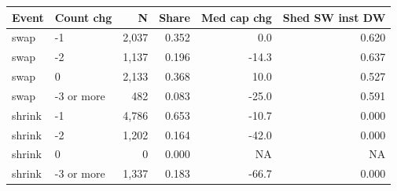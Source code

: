 \begin{tabular}{llrrrr}
\toprule
Event & Count chg & N & Share & Med cap chg & Shed SW inst DW \\
\midrule
swap & -1 & 2,037 & 0.352 & 0.0 & 0.620 \\
swap & -2 & 1,137 & 0.196 & -14.3 & 0.637 \\
swap & 0 & 2,133 & 0.368 & 10.0 & 0.527 \\
swap & -3 or more &   482 & 0.083 & -25.0 & 0.591 \\
shrink & -1 & 4,786 & 0.653 & -10.7 & 0.000 \\
shrink & -2 & 1,202 & 0.164 & -42.0 & 0.000 \\
shrink & 0 &     0 & 0.000 & NA & NA \\
shrink & -3 or more & 1,337 & 0.183 & -66.7 & 0.000 \\
\bottomrule
\end{tabular}
